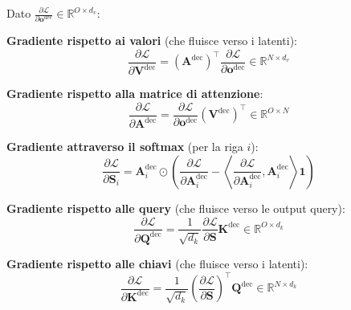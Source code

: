 \documentclass[12pt,a4paper]{article}
\begin{document}
\begin{formulabox}
Dato $\frac{\partial \mathcal{L}}{\partial \mathbf{o}^{\text{dec}}} \in \mathbb{R}^{O \times d_v}$:

\textbf{Gradiente rispetto ai valori} (che fluisce verso i latenti):
\[
\frac{\partial \mathcal{L}}{\partial \mathbf{V}^{\text{dec}}} = (\mathbf{A}^{\text{dec}})^\top \frac{\partial \mathcal{L}}{\partial \mathbf{o}^{\text{dec}}} \in \mathbb{R}^{N \times d_v}
\]

\textbf{Gradiente rispetto alla matrice di attenzione}:
\[
\frac{\partial \mathcal{L}}{\partial \mathbf{A}^{\text{dec}}} = \frac{\partial \mathcal{L}}{\partial \mathbf{o}^{\text{dec}}} (\mathbf{V}^{\text{dec}})^\top \in \mathbb{R}^{O \times N}
\]

\textbf{Gradiente attraverso il softmax} (per la riga $i$):
\[
\frac{\partial \mathcal{L}}{\partial \mathbf{S}_i} = \mathbf{A}_i^{\text{dec}} \odot \left(\frac{\partial \mathcal{L}}{\partial \mathbf{A}_i^{\text{dec}}} - \left\langle \frac{\partial \mathcal{L}}{\partial \mathbf{A}_i^{\text{dec}}}, \mathbf{A}_i^{\text{dec}} \right\rangle \mathbf{1}\right)
\]

\textbf{Gradiente rispetto alle query} (che fluisce verso le output query):
\[
\frac{\partial \mathcal{L}}{\partial \mathbf{Q}^{\text{dec}}} = \frac{1}{\sqrt{d_k}} \frac{\partial \mathcal{L}}{\partial \mathbf{S}} \mathbf{K}^{\text{dec}} \in \mathbb{R}^{O \times d_k}
\]

\textbf{Gradiente rispetto alle chiavi} (che fluisce verso i latenti):
\[
\frac{\partial \mathcal{L}}{\partial \mathbf{K}^{\text{dec}}} = \frac{1}{\sqrt{d_k}} \left(\frac{\partial \mathcal{L}}{\partial \mathbf{S}}\right)^\top \mathbf{Q}^{\text{dec}} \in \mathbb{R}^{N \times d_k}
\]
\end{formulabox}
\end{document}
